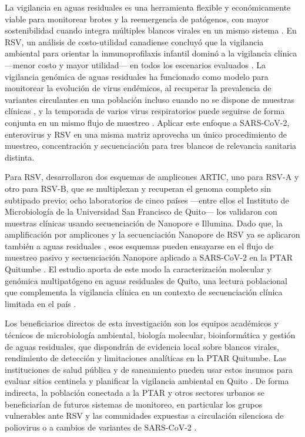 La vigilancia en aguas residuales es una herramienta flexible y económicamente viable para monitorear brotes y la reemergencia de patógenos, con mayor sostenibilidad cuando integra múltiples blancos virales en un mismo sistema \cite{Bubba_2023}. En RSV, un análisis de costo-utilidad canadiense concluyó que la vigilancia ambiental para orientar la inmunoprofilaxis infantil dominó a la vigilancia clínica —menor costo y mayor utilidad— en todos los escenarios evaluados \cite{Mercier_2025}. La vigilancia genómica de aguas residuales ha funcionado como modelo para monitorear la evolución de virus endémicos, al recuperar la prevalencia de variantes circulantes en una población incluso cuando no se dispone de muestras clínicas \cite{Yousif_2023}, y la temporada de varios virus respiratorios puede seguirse de forma conjunta en un mismo flujo de muestreo \cite{Chan_2025}. Aplicar este enfoque a SARS-CoV-2, enterovirus y RSV en una misma matriz aprovecha un único procedimiento de muestreo, concentración y secuenciación para tres blancos de relevancia sanitaria distinta.

Para RSV,  desarrollaron dos esquemas de amplicones ARTIC, uno para RSV-A y otro para RSV-B, que se multiplexan y recuperan el genoma completo sin subtipado previo; ocho laboratorios de cinco países —entre ellos el Instituto de Microbiología de la Universidad San Francisco de Quito— los validaron con muestras clínicas usando secuenciación de Nanopore e Illumina. Dado que, la amplificación por amplicones y la secuenciación Nanopore de RSV ya se aplicaron también a aguas residuales \cite{Le_2025}, esos esquemas pueden ensayarse en el flujo de muestreo pasivo y secuenciación Nanopore aplicado a SARS-CoV-2 en la PTAR Quitumbe \cite{MejiaCalle_2024}. El estudio aporta de este modo la caracterización molecular y genómica multipatógeno en aguas residuales de Quito, una lectura poblacional que complementa la vigilancia clínica en un contexto de secuenciación clínica limitada en el país \cite{Yousif_2023,Bruno_2025}.

Los beneficiarios directos de esta investigación son los equipos académicos y técnicos de microbiología ambiental, biología molecular, bioinformática y gestión de aguas residuales, que dispondrán de evidencia local sobre blancos virales, rendimiento de detección y limitaciones analíticas en la PTAR Quitumbe. Las instituciones de salud pública y de saneamiento pueden usar estos insumos para evaluar sitios centinela y planificar la vigilancia ambiental en Quito \cite{Parkins_2023,MejiaCalle_2024}. De forma indirecta, la población conectada a la PTAR y otros sectores urbanos se beneficiarían de futuros sistemas de monitoreo, en particular los grupos vulnerables ante RSV y las comunidades expuestas a circulación silenciosa de poliovirus o a cambios de variantes de SARS-CoV-2 \cite{Hughes_2022,Bottcher_2025,Crits_Christoph_2021}.

